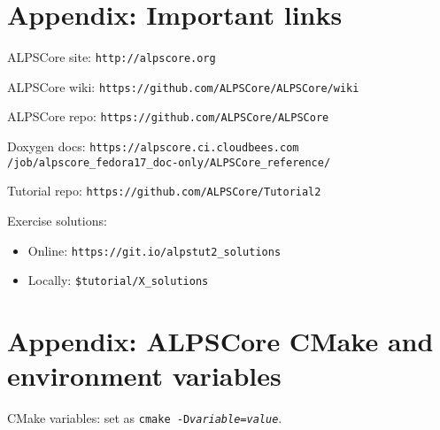 \documentclass[12pt]{article}
\newcommand{\code}[1]{\texttt{#1}}
\begin{document}
\section*{Appendix: Important links}
\begin{flushleft}
ALPSCore site: \nolinkurl{http://alpscore.org}

ALPSCore wiki: \nolinkurl{https://github.com/ALPSCore/ALPSCore/wiki}

ALPSCore repo: \nolinkurl{https://github.com/ALPSCore/ALPSCore}

Doxygen docs: \nolinkurl{https://alpscore.ci.cloudbees.com}
              \nolinkurl{/job/alpscore_fedora17_doc-only/ALPSCore_reference/}

Tutorial repo: \nolinkurl{https://github.com/ALPSCore/Tutorial2}

Exercise solutions:
\begin{itemize}
\item Online: \nolinkurl{https://git.io/alpstut2_solutions}
\item Locally: \code{\color{ballblue}\$tutorial/X\_solutions}
\end{itemize}

\end{flushleft}

\pagebreak
\section*{Appendix: ALPSCore CMake and environment variables}
\label{ref:cmakevars}%
CMake variables: set as \code{cmake
  -D\textit{variable}=\textit{value}}.
\end{document}

